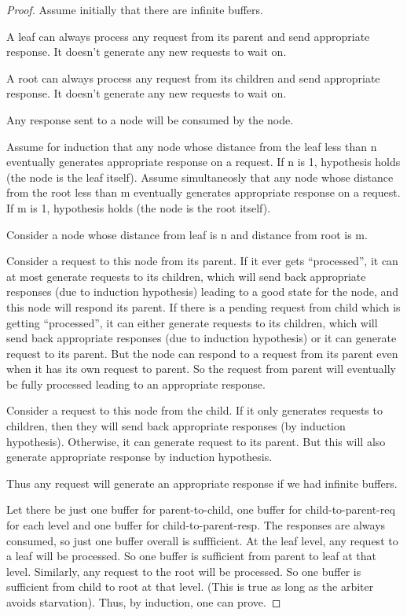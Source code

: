 \documentclass{article}
\begin{document}
\begin{proof}
Assume initially that there are infinite buffers.

A leaf can always process any request from its parent and send appropriate response. It doesn't generate any new requests to wait on.

A root can always process any request from its children and send appropriate response. It doesn't generate any new requests to wait on.

Any response sent to a node will be consumed by the node.

Assume for induction that any node whose distance from the leaf less than n eventually generates appropriate response on a request. If n is 1, hypothesis holds (the node is the leaf itself). Assume simultaneosly that any node whose distance from the root less than m eventually generates appropriate response on a request. If m is 1, hypothesis holds (the node is the root itself).

Consider a node whose distance from leaf is n and distance from root is m.

Consider a request to this node from its parent. If it ever gets ``processed'', it can at most generate requests to its children, which will send back appropriate responses (due to induction hypothesis) leading to a good state for the node, and this node will respond its parent. If there is a pending request from child which is getting ``processed'', it can either generate requests to its children, which will send back appropriate responses (due to induction hypothesis) or it can generate request to its parent. But the node can respond to a request from its parent even when it has its own request to parent. So the request from parent will eventually be fully processed leading to an appropriate response.

Consider a request to this node from the child. If it only generates requests to children, then they will send back appropriate responses (by induction hypothesis). Otherwise, it can generate request to its parent. But this will also generate appropriate response by induction hypothesis.

Thus any request will generate an appropriate response if we had infinite buffers.

Let there be just one buffer for parent-to-child, one buffer for child-to-parent-req for each level and one buffer for child-to-parent-resp. The responses are always consumed, so just one buffer overall is suffficient. At the leaf level, any request to a leaf will be processed. So one buffer is sufficient from parent to leaf at that level. Similarly, any request to the root will be processed. So one buffer is sufficient from child to root at that level. (This is true as long as the arbiter avoids starvation). Thus, by induction, one can prove.
\end{proof}
\end{document}
